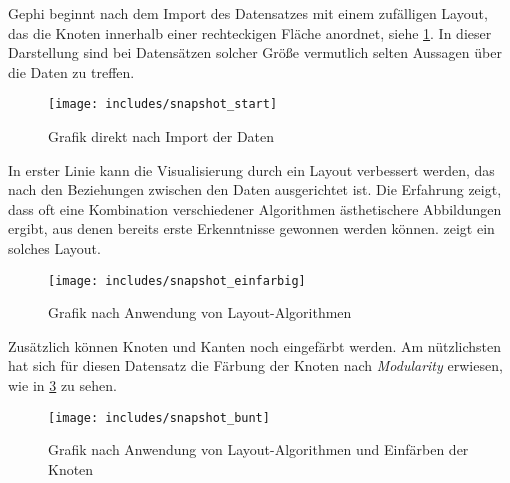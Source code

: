 \documentclass[a4paper,12pt,ngerman]{scrartcl}
\begin{document}
Gephi beginnt nach dem Import des Datensatzes mit einem zufälligen Layout, das die Knoten innerhalb einer rechteckigen Fläche anordnet, siehe \cref{fig:start}. In dieser Darstellung sind bei Datensätzen solcher Größe vermutlich selten Aussagen über die Daten zu treffen.

\begin{figure}[ht]
    \centering
    \texttt{[image: includes/snapshot\_start]}
    \caption{Grafik direkt nach Import der Daten}
    \label{fig:start}
\end{figure}

In erster Linie kann die Visualisierung durch ein Layout verbessert werden, das nach den Beziehungen zwischen den Daten ausgerichtet ist. Die Erfahrung zeigt, dass oft eine Kombination verschiedener Algorithmen ästhetischere Abbildungen ergibt, aus denen bereits erste Erkenntnisse gewonnen werden können.  zeigt ein solches Layout.

\begin{figure}[ht]
    \centering
    \texttt{[image: includes/snapshot\_einfarbig]}
    \caption{Grafik nach Anwendung von Layout-Algorithmen}
    \label{fig:einfarbig}
\end{figure}

Zusätzlich können Knoten und Kanten noch eingefärbt werden. Am nützlichsten hat sich für diesen Datensatz die Färbung der Knoten nach \emph{Modularity} erwiesen, wie in \cref{fig:bunt} zu sehen.

\begin{figure}[ht]
    \centering
    \texttt{[image: includes/snapshot\_bunt]}
    \caption{Grafik nach Anwendung von Layout-Algorithmen und Einfärben der Knoten}
    \label{fig:bunt}
\end{figure}
\end{document}
